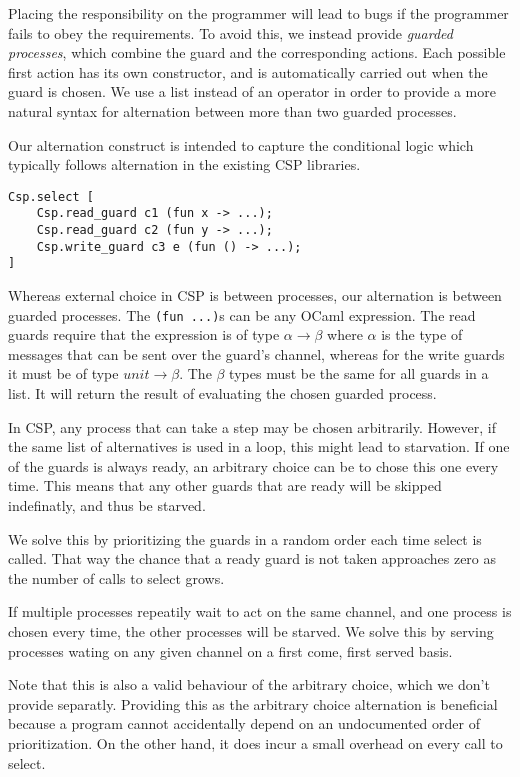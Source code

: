 \documentclass[a4paper,12pt]{article}
\begin{document}
Placing the responsibility on the programmer will lead to bugs if the programmer fails to obey the 
requirements. To avoid this, we instead provide \emph{guarded processes}, which combine the guard and
the corresponding actions. Each possible first action has its own constructor,
and is automatically carried out when the guard is chosen. We use a list instead of an operator in order to provide a more 
natural syntax for alternation between more than two guarded processes.

Our alternation construct is intended to capture the conditional logic which typically follows 
alternation in the existing CSP libraries.

\begin{verbatim}
Csp.select [
    Csp.read_guard c1 (fun x -> ...);
    Csp.read_guard c2 (fun y -> ...);
    Csp.write_guard c3 e (fun () -> ...);
]
\end{verbatim}


Whereas external choice in CSP is between processes, our alternation is between guarded processes.
The \verb|(fun ...)|s can be any OCaml expression. The read guards require that the expression is of type
$\alpha \to \beta$ where $\alpha$ is the type of messages that can be sent over the guard's channel, whereas
for the write guards it must be of type $unit \to \beta$. The $\beta$ types must be the same for all guards in 
a list. It will return the result of evaluating the chosen guarded process.

In CSP, any process that can take a step may be chosen arbitrarily. However, if the same list of 
alternatives is used in a loop, this might lead to starvation. If one of the guards is always ready,
an arbitrary choice can be to chose this one every time. This means that any other guards that are 
ready will be skipped indefinatly, and thus be starved.

We solve this by prioritizing the guards in a random order each time select is called. That way the
chance that a ready guard is not taken approaches zero as the number of calls to select grows.

If multiple processes repeatily wait to act on the same channel, and one process is chosen every time,
the other processes will be starved. We solve this by serving processes wating on any given channel
on a first come, first served basis.

Note that this is also a valid behaviour of the arbitrary choice, which we don't
provide separatly. Providing this as the arbitrary choice alternation is
beneficial because a program cannot accidentally depend on an undocumented
order of prioritization. On the other hand, it does incur a small overhead on
every call to select.
\end{document}
